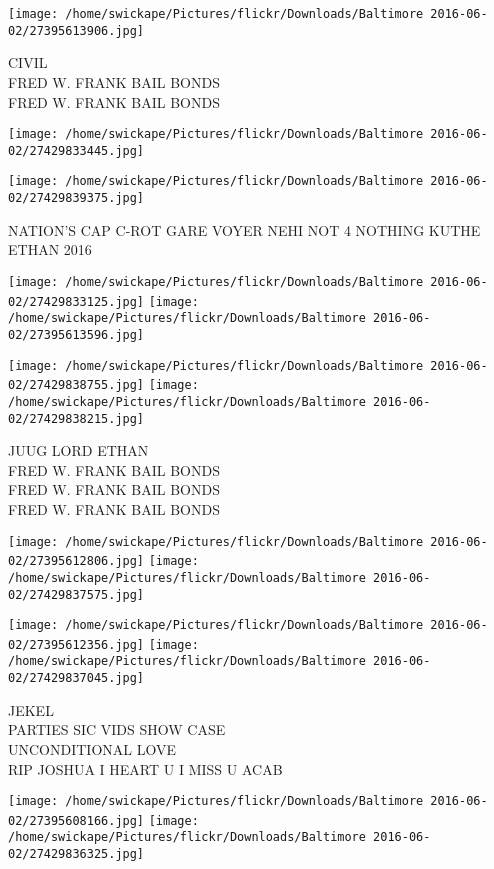 \documentclass[10pt,letterpaper]{article}
\begin{document}
\vspace{0.25in}
\texttt{[image: /home/swickape/Pictures/flickr/Downloads/Baltimore 2016-06-02/27395613906.jpg]}

CIVIL\\
FRED W. FRANK BAIL BONDS\\
FRED W. FRANK BAIL BONDS
\pagebreak

\texttt{[image: /home/swickape/Pictures/flickr/Downloads/Baltimore 2016-06-02/27429833445.jpg]}

\vspace{0.25in}
\texttt{[image: /home/swickape/Pictures/flickr/Downloads/Baltimore 2016-06-02/27429839375.jpg]}

NATION'S CAP C{-}ROT GARE VOYER NEHI NOT 4 NOTHING KUTHE\\
ETHAN 2016
\pagebreak

\texttt{[image: /home/swickape/Pictures/flickr/Downloads/Baltimore 2016-06-02/27429833125.jpg]}
\texttt{[image: /home/swickape/Pictures/flickr/Downloads/Baltimore 2016-06-02/27395613596.jpg]}

\texttt{[image: /home/swickape/Pictures/flickr/Downloads/Baltimore 2016-06-02/27429838755.jpg]}
\texttt{[image: /home/swickape/Pictures/flickr/Downloads/Baltimore 2016-06-02/27429838215.jpg]}

JUUG LORD ETHAN\\
FRED W. FRANK BAIL BONDS\\
FRED W. FRANK BAIL BONDS\\
FRED W. FRANK BAIL BONDS
\pagebreak

\texttt{[image: /home/swickape/Pictures/flickr/Downloads/Baltimore 2016-06-02/27395612806.jpg]}
\texttt{[image: /home/swickape/Pictures/flickr/Downloads/Baltimore 2016-06-02/27429837575.jpg]}

\texttt{[image: /home/swickape/Pictures/flickr/Downloads/Baltimore 2016-06-02/27395612356.jpg]}
\texttt{[image: /home/swickape/Pictures/flickr/Downloads/Baltimore 2016-06-02/27429837045.jpg]}

JEKEL\\
PARTIES SIC VIDS SHOW CASE\\
UNCONDITIONAL LOVE\\
RIP JOSHUA I HEART U I MISS U ACAB
\pagebreak

\texttt{[image: /home/swickape/Pictures/flickr/Downloads/Baltimore 2016-06-02/27395608166.jpg]}
\texttt{[image: /home/swickape/Pictures/flickr/Downloads/Baltimore 2016-06-02/27429836325.jpg]}
\end{document}
